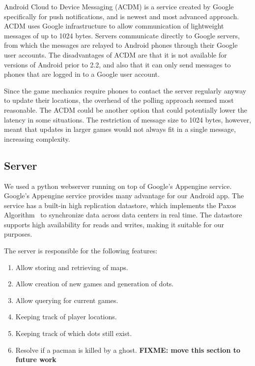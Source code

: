 \documentclass{acm_proc_article-sp}
\newcommand{\FIXME}[1]{{\color{red}\textbf{FIXME: #1}}}
\begin{document}
Android Cloud to Device Messaging (ACDM) is a service created by Google
specifically for push notifications, and is newest and most advanced approach.
ACDM uses Google infrastructure to allow communication of lightweight messages
of up to 1024 bytes. Servers communicate directly to Google servers, from which
the messages are relayed to Android phones through their Google user accounts.
The disadvantages of ACDM are that it is not available for versions of Android
prior to 2.2, and also that it can only send messages to phones that are logged
in to a Google user account.

Since the game mechanics require phones to contact the server regularly anyway
to update their locations, the overhead of the polling approach seemed most
reasonable. The ACDM could be another option that could potentially lower the
latency in some situations. The restriction of message size to 1024 bytes,
however, meant that updates in larger games would not always fit in a single
message, increasing complexity.


\subsection{Server}

We used a python webserver running on top of Google's Appengine
service. Google's Appengine service provides many advantage for our
Android app. The service has a built-in high replication datastore,
which implements the Paxos Algorithm~\cite{lamport01paxos} to
synchronize data across data centers in real time. The datastore
supports high availability for reads and writes, making it suitable
for our purposes.

The server is responsible for the following features:

\begin{enumerate}
\item Allow storing and retrieving of maps.
\item Allow creation of new games and generation of dots.
\item Allow querying for current games.
\item Keeping track of player locations.
\item Keeping track of which dots still exist.
\item Resolve if a pacman is killed by a ghost. \FIXME{move this section to future work}
\end{enumerate}
\end{document}
